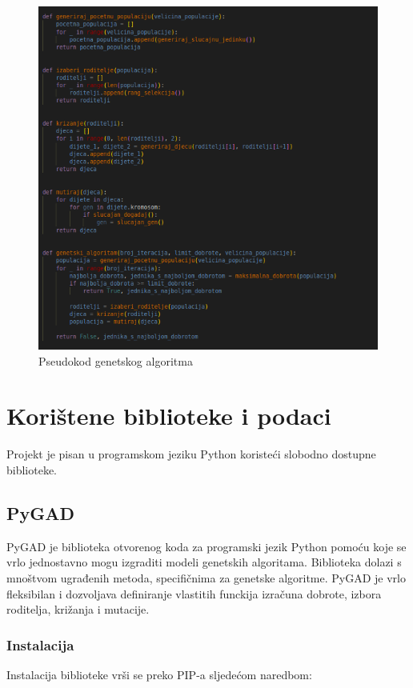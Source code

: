\documentclass[times, utf8, zavrsni]{fer}
\begin{document}
\begin{figure}[htb]
\centering
\includegraphics[width=14cm]{images/genetski_algoritam_pseudokod.png}
\caption{Pseudokod genetskog algoritma}
\label{fig:pseudokod genetskog algoritma}
\end{figure}

\chapter{Korištene biblioteke i podaci}
Projekt je pisan u programskom jeziku Python koristeći slobodno dostupne biblioteke.

\section{PyGAD}
PyGAD je biblioteka otvorenog koda za programski jezik Python pomoću koje se vrlo jednostavno mogu izgraditi modeli genetskih algoritama. Biblioteka dolazi s mnoštvom ugrađenih metoda, specifičnima za genetske algoritme. PyGAD je vrlo fleksibilan i dozvoljava definiranje vlastitih funckija izračuna dobrote, izbora roditelja, križanja i mutacije.

\subsection{Instalacija}
Instalacija biblioteke vrši se preko PIP-a sljedećom naredbom:
\end{document}
